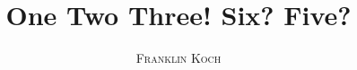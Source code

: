 \documentclass[a4paper,11pt,oneside]{book}
\title{\Huge \textbf{One Two Three! Six? Five?}}
\author{\textsc{Franklin Koch}}
\begin{document}
\sloppy

\frontmatter
\maketitle

\tableofcontents

\mainmatter

% 
% 










\end{document}
